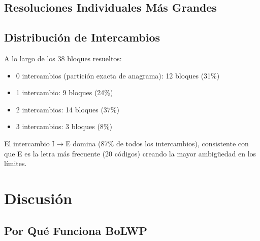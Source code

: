 \documentclass[11pt,a4paper]{article}
\begin{document}
\subsection{Resoluciones Individuales Más Grandes}

\begin{table}[htbp]
\centering
{}
\end{table}

\subsection{Distribución de Intercambios}

A lo largo de los 38 bloques resueltos:
\begin{itemize}
\item 0 intercambios (partición exacta de anagrama): 12 bloques (31\%)
\item 1 intercambio: 9 bloques (24\%)
\item 2 intercambios: 14 bloques (37\%)
\item 3 intercambios: 3 bloques (8\%)
\end{itemize}

El intercambio I$\rightarrow$E domina (87\% de todos los intercambios), consistente con que E es la letra más frecuente (20 códigos) creando la mayor ambigüedad en los límites.

\section{Discusión}

\subsection{Por Qué Funciona BoLWP}
\end{document}
